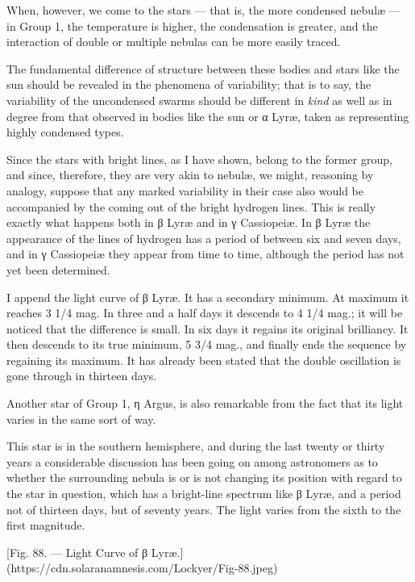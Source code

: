 \documentclass[a4paper, 12pt, oneside, polutonikogreek, english]{article}
\begin{document}
When, however, we come to the stars --- that is, the more condensed nebulæ --- in Group 1, the temperature is higher, the condensation is greater, and the interaction of double or multiple nebulas can be more easily traced.

The fundamental difference of structure between these bodies and stars like the sun should be revealed in the phenomena of variability; that is to say, the variability of the uncondensed swarms should be different in \emph{kind} as well as in degree from that observed in bodies like the sun or α Lyræ, taken as representing highly condensed types.

Since the stars with bright lines, as I have shown, belong to the former group, and since, therefore, they are very akin to nebulæ, we might, reasoning by analogy, suppose that any marked variability in their case also would be accompanied by the coming out of the bright hydrogen lines. This is really exactly what happens both in β Lyræ and in γ Cassiopeiæ. In β Lyræ the appearance of the lines of hydrogen has a period of between six and seven days, and in γ Cassiopeiæ they appear from time to time, although the period has not yet been determined.

I append the light curve of β Lyræ. It has a secondary minimum. At maximum it reaches 3 1/4 mag. In three and a half days it descends to 4 1/4 mag.; it will be noticed that the difference is small. In six days it regains its original brilliancy. It then descends to its true minimum, 5 3/4 mag., and finally ends the sequence by regaining its maximum. It has already been stated that the double oscillation is gone through in thirteen days.

Another star of Group 1, η Argus, is also remarkable from the fact that its light varies in the same sort of way.

This star is in the southern hemisphere, and during the last twenty or thirty years a considerable discussion has been going on among astronomers as to whether the surrounding nebula is or is not changing its position with regard to the star in question, which has a bright-line spectrum like β Lyræ, and a period not of thirteen days, but of seventy years. The light varies from the sixth to the first magnitude.

[Fig. 88. --- Light Curve of β Lyræ.](https://cdn.solaranamnesis.com/Lockyer/Fig-88.jpeg)
\end{document}

